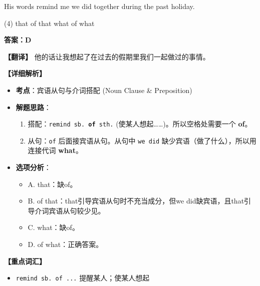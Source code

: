 \documentclass[11pt, a4paper]{article}
\newcommand{\analysis}[4]{
    \begin{solutionbox}
        \textbf{答案：#1}
        
        \textbf{【翻译】} #2
        
        \textbf{【详细解析】}
        #3
        
        \textbf{【重点词汇】}
        #4
    \end{solutionbox}
}
\newcommand{\blank}{\underline{\hspace{1.5cm}}}
\begin{document}
\begin{questions}
    \item His words remind me \blank we did together during the past holiday.
    \begin{tasks}(4)
        \task that \task of that \task what \task of what
    \end{tasks}
    \analysis{D}{他的话让我想起了在过去的假期里我们一起做过的事情。}{
        \begin{itemize}
            \item \textbf{考点}：宾语从句与介词搭配 (Noun Clause \& Preposition)
            \item \textbf{解题思路}：
                \begin{enumerate}
                    \item 搭配：\texttt{remind sb. \textbf{of} sth.} (使某人想起……)。所以空格处需要一个 \textbf{of}。
                    \item 从句：\texttt{of} 后面接宾语从句。从句中 \texttt{we did} 缺少宾语（做了什么），所以用连接代词 \textbf{what}。
                \end{enumerate}
            \item \textbf{选项分析}：
                \begin{itemize}
                    \item A. that：缺of。
                    \item B. of that：that引导宾语从句时不充当成分，但we did缺宾语，且that引导介词宾语从句较少见。
                    \item C. what：缺of。
                    \item D. of what：正确答案。
                \end{itemize}
        \end{itemize}
    }{
        \begin{itemize}
            \item \texttt{remind sb. of ...} 提醒某人；使某人想起
        \end{itemize}
    }


\end{questions}
\end{document}
